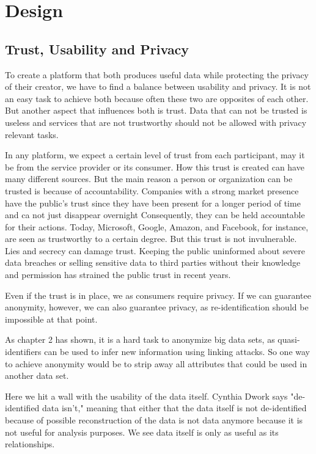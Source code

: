 
\chapter{Design}\label{chapter:design}
\section{Trust, Usability and Privacy}
To create a platform that both produces useful data while protecting the privacy of their creator, we have to find a balance between usability and privacy. It is not an easy task to achieve both because often these two are opposites of each other. But another aspect that influences both is trust. Data that can not be trusted is useless and services that are not trustworthy should not be allowed with privacy relevant tasks.
 
In any platform, we expect a certain level of trust from each participant, may it be from the service provider or its consumer. How this trust is created can have many different sources. But the main reason a person or organization can be trusted is because of accountability. Companies with a strong market presence have the public's trust since they have been present for a longer period of time and ca not just disappear overnight
 Consequently, they can be held accountable for their actions. Today, Microsoft, Google, Amazon, and Facebook, for instance, are seen as trustworthy to a certain degree. But this trust is not invulnerable. Lies and secrecy can damage trust. Keeping the public uninformed about severe data breaches or selling sensitive data to third parties without their knowledge and permission has strained the public trust in recent years.

Even if the trust is in place, we as consumers require privacy. If we can guarantee anonymity, however, we can also guarantee privacy, as re-identification should be impossible at that point.

As chapter 2 has shown, it is a hard task to anonymize big data sets, as quasi-identifiers can be used to infer new information using linking attacks. So one way to achieve anonymity would be to strip away all attributes that could be used in another data set.

Here we hit a wall with the usability of the data itself. Cynthia Dwork says "de-identified data isn't,"
meaning that either that the data itself is not de-identified because of possible reconstruction of the data is not data anymore because it is not useful for analysis purposes. We see data itself is only as useful as its relationships.

